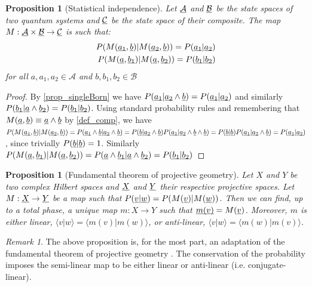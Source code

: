 \documentclass[aps,prl,amsmath,amssymb,twocolumn,nofootinbib]{revtex4}
\theoremstyle{plain}
\newtheorem{prop}[thrm]{Proposition}
\theoremstyle{definition}
\theoremstyle{remark}
\newtheorem*{remark}{Remark}
\newcommand{\pj}[1] {\underbar{$#1$}}
\def\>{\rangle}
\def\<{\langle}
\begin{document}
\begin{prop}[Statistical independence]\label{prop_statInd}
Let $\pj{\mathcal{A}}$ and $\pj{\mathcal{B}}$ be the state spaces of two quantum systems and $\pj{\mathcal{C}}$ be the state space of their composite. The map $M : \pj{\mathcal{A}} \times \pj{\mathcal{B}} \to \pj{\mathcal{C}}$ is such that:
\begin{align}
P(M(\pj{a_1},\pj{b}) | M(\pj{a_2},\pj{b})) = P(\pj{a_1} | \pj{a_2})  \\ P(M(\pj{a},\pj{b_1}) | M(\pj{a},\pj{b_2})) = P(\pj{b_1} | \pj{b_2})
\end{align}
for all $a, a_1, a_2 \in \mathcal{A}$ and $b, b_1, b_2 \in \mathcal{B}$
\end{prop}
\begin{proof}
  By \ref{prop_singleBorn} we have $P(\pj{a_1} | \pj{a_2} \wedge \pj{b}) = P(\pj{a_1} | \pj{a_2})$ and similarly $P(\pj{b_1} | \pj{a} \wedge \pj{b_2}) = P(\pj{b_1} | \pj{b_2})$.  Using standard probability rules and remembering that $M(\pj{a},\pj{b})\equiv \pj{a} \wedge \pj{b}$ by \ref{def_comp}, we have $P(M(\pj{a_1},\pj{b}) | M(\pj{a_2},\pj{b})) = P(\pj{a_1} \wedge \pj{b} | \pj{a_2} \wedge \pj{b})  = P(\pj{b} | \pj{a_2} \wedge \pj{b}) P(\pj{a_1} | \pj{a_2} \wedge \pj{b} \wedge \pj{b})  = P(\pj{b} | \pj{b}) P(\pj{a_1} | \pj{a_2} \wedge \pj{b}) = P(\pj{a_1} | \pj{a_2})$, since trivially $P(\pj{b}|\pj{b})=1$. Similarly $P(M(\pj{a},\pj{b_1}) | M(\pj{a},\pj{b_2})) =P(\pj{a} \wedge \pj{b_1} | \pj{a} \wedge \pj{b_2}) = P(\pj{b_1} | \pj{b_2})$
\end{proof}

\begin{prop}[Fundamental theorem of projective geometry]\label{prop_fundProj}
    Let $X$ and $Y$ be two complex Hilbert spaces and $\pj{X}$ and $\pj{Y}$ their respective projective spaces. Let $M : \pj{X} \to \pj{Y}$ be a map such that $P(\pj{v}|\pj{w}) = P(M(\pj{v})|M(\pj{w}))$. Then we can find, up to a total phase, a unique map $m : X \to Y$ such that $\pj{m(v)}=M(\pj{v})$. Moreover, $m$ is either linear, $\<v|w\> = \<m(v)|m(w)\>$, or anti-linear, $\<v|w\> = \<m(w)|m(v)\>$.
\end{prop}

\begin{remark}
  The above proposition is, for the most part, an adaptation of the fundamental theorem of projective geometry \cite{fun}. The conservation of the probability imposes the semi-linear map to be either linear or anti-linear (i.e. conjugate-linear).
\end{remark}
\end{document}
